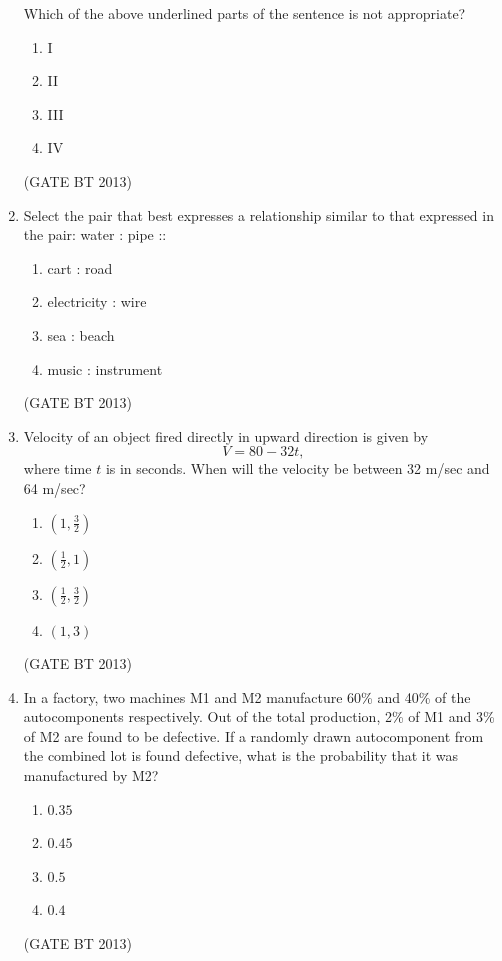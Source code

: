 \documentclass[journal,12pt,onecolumn]{IEEEtran}
\theoremstyle{remark}
\begin{document}
\begin{enumerate}
Which of the above underlined parts of the sentence is not appropriate?

\begin{enumerate}
    \item I
    \item II
    \item III
    \item IV
\end{enumerate} \hfill(GATE BT 2013)

\item 

Select the pair that best expresses a relationship similar to that expressed in the pair:  
water : pipe ::

\begin{enumerate}
    \item cart : road
    \item electricity : wire
    \item sea : beach
    \item music : instrument
\end{enumerate} \hfill(GATE BT 2013)

\item 

Velocity of an object fired directly in upward direction is given by
\[
V = 80 - 32t,
\]
where time \(t\) is in seconds. When will the velocity be between 32 m/sec and 64 m/sec?

\begin{enumerate}
    \item \((1, \tfrac{3}{2})\)
    \item \(\left(\tfrac{1}{2}, 1\right)\)
    \item \(\left(\tfrac{1}{2}, \tfrac{3}{2}\right)\)
    \item \((1, 3)\)
\end{enumerate} \hfill(GATE BT 2013)

\item 

In a factory, two machines M1 and M2 manufacture 60\% and 40\% of the autocomponents respectively. Out of the total production, 2\% of M1 and 3\% of M2 are found to be defective. If a randomly drawn autocomponent from the combined lot is found defective, what is the probability that it was manufactured by M2?

\begin{enumerate}
    \item $0.35$
    \item $0.45$
    \item $0.5$
    \item $0.4$
\end{enumerate} \hfill(GATE BT 2013)


\end{enumerate}
\end{document}
